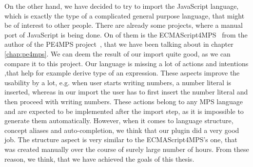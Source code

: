 On the other hand, we have decided to try to import the JavaScript language, which is exactly the type of a complicated general purpose language, that might be of interest to other people.
There are already some projects, where a manual port of JavaScript is being done.
On of them is the ECMAScript4MPS~\cite{ECMAScript4MPS} from the author of the PE4MPS project~\cite{PE4MPS}, that we have been talking about in chapter \ref{chap:pe4mps}.
We can deem the result of our import quite good, as we can compare it to this project.
Our language is missing a lot of actions and intentions ,that help for example derive type of an expression.
These aspects improve the usability by a lot, e.g. when user starts writing numbers, a number literal is inserted, whereas in our import the user has to first insert the number literal and then proceed with writing numbers.
These actions belong to any MPS language and are expected to be implemented after the import step, as it is impossible to generate them automatically.
However, when it comes to language structure, concept aliases and auto-completion, we think that our plugin did a very good job.
The structure aspect is very similar to the ECMAScript4MPS's one, that was created manually over the course of surely large number of hours.
From these reason, we think, that we have achieved the goals of this thesis.
